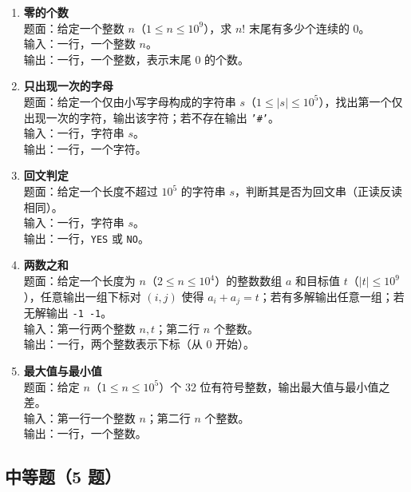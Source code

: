 \documentclass{article}
\begin{document}
\begin{enumerate}[label=\textbf{S\arabic*.}]
  \item \textbf{零的个数}\\
    题面：给定一个整数 $n$（$1\le n\le 10^9$），求 $n!$ 末尾有多少个连续的 0。\\
    输入：一行，一个整数 $n$。\\
    输出：一行，一个整数，表示末尾 0 的个数。

  \item \textbf{只出现一次的字母}\\
    题面：给定一个仅由小写字母构成的字符串 $s$（$1\le |s|\le 10^5$），找出第一个仅出现一次的字符，输出该字符；若不存在输出 \texttt{'\#'}。\\
    输入：一行，字符串 $s$。\\
    输出：一行，一个字符。

  \item \textbf{回文判定}\\
    题面：给定一个长度不超过 $10^5$ 的字符串 $s$，判断其是否为回文串（正读反读相同）。\\
    输入：一行，字符串 $s$。\\
    输出：一行，\texttt{YES} 或 \texttt{NO}。

  \item \textbf{两数之和}\\
    题面：给定一个长度为 $n$（$2\le n\le 10^4$）的整数数组 $a$ 和目标值 $t$（$|t|\le 10^9$），任意输出一组下标对 $(i,j)$ 使得 $a_i+a_j=t$；若有多解输出任意一组；若无解输出 \texttt{-1 -1}。\\
    输入：第一行两个整数 $n,t$；第二行 $n$ 个整数。\\
    输出：一行，两个整数表示下标（从 0 开始）。

  \item \textbf{最大值与最小值}\\
    题面：给定 $n$（$1\le n\le 10^5$）个 32 位有符号整数，输出最大值与最小值之差。\\
    输入：第一行一个整数 $n$；第二行 $n$ 个整数。\\
    输出：一行，一个整数。
\end{enumerate}

\subsection{中等题（5 题）}
\end{document}
